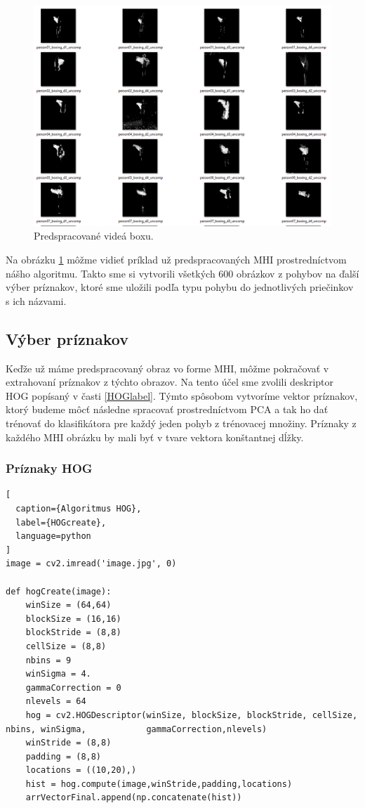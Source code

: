 \begin{figure}[H]
  \centering
  \includegraphics[width=15cm]{img/MHIbox.png}
  \caption{Predspracované videá boxu.}
  \label{MHIbox}
\end{figure}  

Na obrázku \ref{MHIbox} môžme vidieť príklad už predspracovaných MHI prostredníctvom nášho algoritmu. Takto sme si vytvorili všetkých 600 obrázkov z pohybov na ďalší výber príznakov, ktoré sme uložili podľa typu pohybu do jednotlivých priečinkov s ich názvami. 

\subsection{Výber príznakov}
Keďže už máme predspracovaný obraz vo forme MHI, môžme pokračovať v extrahovaní príznakov z týchto obrazov. Na tento účel sme zvolili deskriptor HOG popísaný v časti \ref{HOGlabel}. Týmto spôsobom vytvoríme vektor príznakov, ktorý budeme môcť následne spracovať prostredníctvom PCA a tak ho dať trénovať do klasifikátora pre každý jeden pohyb z trénovacej množiny. Príznaky z každého MHI obrázku by mali byť v tvare vektora konštantnej dĺžky. 

\subsubsection{Príznaky HOG} \label{HOGim}
\begin{lstlisting}[
  caption={Algoritmus HOG},
  label={HOGcreate},
  language=python
]
image = cv2.imread('image.jpg', 0)

def hogCreate(image):
    winSize = (64,64)
    blockSize = (16,16)
    blockStride = (8,8)
    cellSize = (8,8)
    nbins = 9
    winSigma = 4.
    gammaCorrection = 0
    nlevels = 64
    hog = cv2.HOGDescriptor(winSize, blockSize, blockStride, cellSize, nbins, winSigma,            gammaCorrection,nlevels)
    winStride = (8,8)
    padding = (8,8)
    locations = ((10,20),)
    hist = hog.compute(image,winStride,padding,locations)
    arrVectorFinal.append(np.concatenate(hist))
\end{lstlisting}

